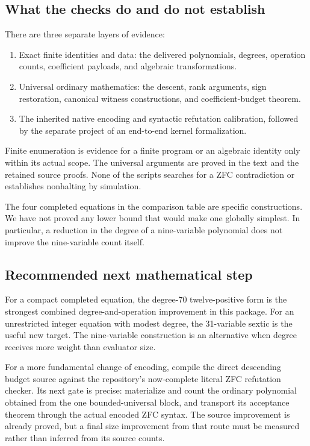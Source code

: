 \documentclass[11pt]{article}
\theoremstyle{definition}
\theoremstyle{remark}
\begin{document}
\subsection{What the checks do and do not establish}

There are three separate layers of evidence:
\begin{enumerate}
\item Exact finite identities and data: the delivered polynomials, degrees,
operation counts, coefficient payloads, and algebraic transformations.
\item Universal ordinary mathematics: the descent, rank arguments, sign
restoration, canonical witness constructions, and coefficient-budget theorem.
\item The inherited native encoding and syntactic refutation calibration,
followed by the separate project of an end-to-end kernel formalization.
\end{enumerate}
Finite enumeration is evidence for a finite program or an algebraic identity
only within its actual scope. The universal arguments are proved in the
text and the retained source proofs. None of the scripts searches for a
ZFC contradiction or establishes nonhalting by simulation.

The four completed equations in the comparison table are specific
constructions. We have not proved any lower bound that would make one
globally simplest. In particular, a reduction in the degree of a nine-variable
polynomial does not improve the nine-variable count itself.

\subsection{Recommended next mathematical step}

For a compact completed equation, the degree-70 twelve-positive form is the
strongest combined degree-and-operation improvement in this package. For an
unrestricted integer equation with modest degree, the 31-variable sextic is
the useful new target. The nine-variable construction is an alternative when
degree receives more weight than evaluator size.

For a more fundamental change of encoding, compile the direct descending
budget source against the repository's now-complete literal ZFC refutation
checker. Its next gate is precise: materialize and count the ordinary
polynomial obtained from the one bounded-universal block, and transport
its acceptance theorem through the actual encoded ZFC syntax. The source
improvement is already proved, but a final size improvement from that route
must be measured rather than inferred from its source counts.
\end{document}
